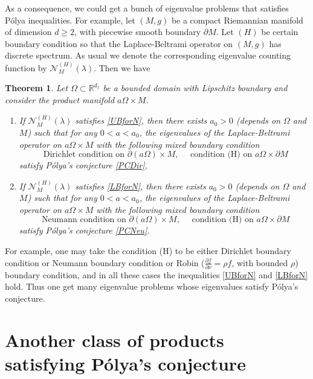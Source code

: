 \documentclass[11pt,letterpaper]{amsart}
\numberwithin{equation}{section}
\theoremstyle{plain}
\newtheorem{theorem}{Theorem}[section]
\theoremstyle{plain}
\numberwithin{equation}{section}
\theoremstyle{remark}
\begin{document}
	
	As a consequence, we could get a bunch of eigenvalue problems that satisfies P\'olya inequalities. For example,  let $(M,g)$ be a compact Riemannian manifold  of dimension $d\ge 2$, with piecewise smooth boundary $\partial M$. Let  $(H)$ be certain boundary condition so that the Laplace-Beltrami operator  on $(M,g)$ has discrete spectrum.  As usual we denote the corresponding eigenvalue counting function by $\mathcal N^{(H)}_M(\lambda)$. Then we have 
\begin{theorem}\label{mthm4}
	Let $\Omega\subset \mathbb R^{d_1}$ be a bounded domain with Lipschitz boundary and consider the product manifold $a\Omega \times M$. 
	\begin{enumerate}[(1)]
		\item If $\mathcal N^{(H)}_M(\lambda)$ satisfies \eqref{UBforN}, then  there exists $a_0>0$ (depends on $\Omega$ and $M$) such that for any $0<a<a_0$,  the eigenvalues of the Laplace-Beltrami operator  on  $a\Omega \times M$ with the following mixed boundary condition 
		\[\text{ Dirichlet condition on }\partial (a\Omega)\times M, \quad \text{   condition (H) on }  a\Omega\times\partial M \]  
		satisfy P\'olya's conjecture \eqref{PCDir},\\
		\item If $\mathcal N^{(H)}_M(\lambda)$ satisfies \eqref{LBforN}, then  there exists $a_0>0$ (depends on $\Omega$ and $M$) such that for any $0<a<a_0$,  the eigenvalues of the Laplace-Beltrami operator  on  $a\Omega \times M$
		with the following mixed boundary condition 
		\[\text{ Neumann condition on }\partial (a\Omega)\times M, \quad \text{   condition (H) on }  a\Omega\times\partial M \]  
		satisfy P\'olya's conjecture \eqref{PCNeu}.
	\end{enumerate}
\end{theorem}

For example, one may take the condition (H) to be either  Dirichlet boundary condition or Neumann boundary condition or Robin ($\frac{\partial f}{\partial \nu}=\rho f$, with bounded $\rho$) boundary condition, and in all these cases the inequalities  \eqref{UBforN} and  \eqref{LBforN} hold. Thus one   get many eigenvalue problems whose eigenvalues  satisfy P\'olya's conjecture.

\section{Another  class of products satisfying P\'olya's conjecture}\label{spepro}
\end{document}
